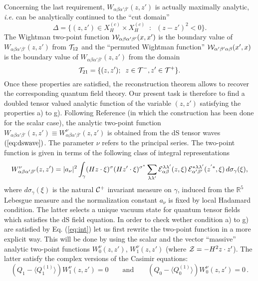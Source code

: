 \documentclass[a4paper,11pt,showpacs,preprintnumbers]{revtex4}
\def\setR{\mathbb{R}}
\def\z {{\cal Z}}
\begin{document}
Concerning the last requirement,
$W_{\alpha\beta\alpha'\beta'}(z,z')$ is actually maximally
analytic, {\it i.e.} can be analytically continued to the ``cut
domain''
$$\Delta=\{(z,z') \in X_H^{(c)} \times X_H^{(c)} \;\; :\;\;(z-z')^2< 0\}.$$
The Wightman  two-point function ${\cal
W}_{\alpha\beta\alpha'\beta' }(x,x')$ is the boundary value of
$W_{\alpha\beta\alpha'\beta'}(z,z')$ from ${\cal T}_{12}$ and the
``permuted Wightman function'' ${\cal W}_{\alpha'\beta'\alpha\beta
}(x',x)$ is the boundary value of
$W_{\alpha\beta\alpha'\beta'}(z,z')$ from the domain
$$ {\cal T}_{21}=\{ (z,z');\;\; z\in {\cal T}^-, z'\in{\cal T}^+\}. $$
Once these properties are satisfied, the reconstruction theorem
\cite{stwi}  allows to recover the corresponding quantum field
theory. Our present task is therefore to find a doubled tensor
valued analytic function of the variable $ (z, z')$  satisfying
the properties a) to g). Following Reference \cite{brmo} (in which
the construction has been done for the scalar case), the analytic
two-point function $W_{\alpha\beta\alpha'\beta'}(z,z') \equiv
W^\nu _{\alpha\beta\alpha'\beta'}(z,z')$ is obtained from the dS
tensor waves  $(\ref{eq:dswave})$. The parameter $\nu$ refers to
the principal series. The two-point function is given in terms of
the following class of integral representations
\begin{equation}
W^\nu _{\alpha\beta \alpha'\beta'}(z,z')= \vert
a_{\nu}\vert^{2}\int_\gamma (Hz\cdot \xi)^{\sigma} (H
z'\cdot\xi)^{\sigma^{*}}\sum_{\lambda\lambda'}{\cal
E}^{\lambda\lambda'}_{\alpha\beta }(z,\xi) \,{\cal
E}^{*\lambda\lambda'}_{\alpha'\beta'}(z^{'*},\xi)\,d\sigma_\gamma(\xi),
\label{eq:int}
\end{equation}
where  $d\sigma_{\gamma}(\xi)$ is the natural ${\cal C}^{+}$
invariant measure on $\gamma$, induced from the $\setR^{5}$
Lebesgue measure \cite{brmo} and the normalization constant
$a_{\nu}$ is fixed by local Hadamard condition. The latter selects
a unique vacuum state for quantum tensor fields which satisfies
the dS field equation. In order to check wether condition a) to g)
are satisfied by Eq. (\ref{eq:int}) let us first  rewrite  the
two-point function in a more explicit way. This will be done by
using the scalar and the vector ``massive'' analytic two-point
functions  $W^{\nu}_{0}(z,z')$, $ W_{1}^{\nu}(z,z')$ (where
$\z=-H^{2}z\cdot z'$). The latter satisfy the complex versions of
the Casimir equations:
\begin{equation}
\left(Q_{1}-\langle Q_{1}^{(1)}\rangle\right) W^{\nu}_{1}(z,z')=0
\label{eq:tp1}\qquad\mbox{and}\qquad\left(Q_{0}-\langle
Q_{0}^{(1)}\rangle\right)W^{\nu}_{0}(z,z')=0\, .
\end{equation}
\end{document}
